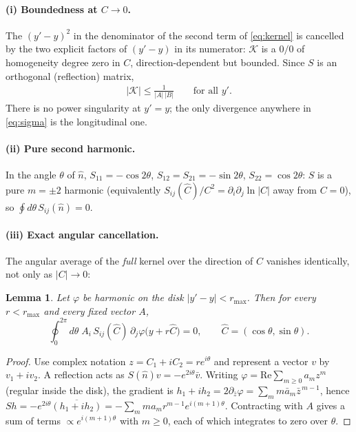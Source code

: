 \documentclass[11pt]{article}
\newtheorem{lemma}{Lemma}
\newcommand{\bA}{A}
\newcommand{\bB}{B}
\newcommand{\bC}{C}
\newcommand{\Chat}{\hat C}
\begin{document}
\paragraph{(i) Boundedness at $\bC\to0$.}  The $(y'-y)^2$ in the
denominator of the second term of \eqref{eq:kernel} is cancelled by the
two explicit factors of $(y'-y)$ in its numerator: $\mathcal K$ is a
$0/0$ of homogeneity degree zero in $\bC$, direction-dependent but
bounded.  Since $S$ is an orthogonal (reflection) matrix,
\begin{align}
|\mathcal K|\le \frac{1}{|\bA|\,|\bB|}\qquad\text{for all }y'.
\label{eq:bound}
\end{align}
There is no power singularity at $y'=y$; the only divergence anywhere
in \eqref{eq:sigma} is the longitudinal one.

\paragraph{(ii) Pure second harmonic.}  In the angle $\theta$ of
$\hat n$, $S_{11}=-\cos2\theta$, $S_{12}=S_{21}=-\sin2\theta$,
$S_{22}=\cos2\theta$: $S$ is a pure $m=\pm2$ harmonic
(equivalently $S_{ij}(\Chat)/\bC^2=\partial_i\partial_j\ln|\bC|$ away
from $\bC=0$), so $\oint d\theta\,S_{ij}(\hat n)=0$.

\paragraph{(iii) Exact angular cancellation.}  The angular average of
the \emph{full} kernel over the direction of $\bC$ vanishes identically,
not only as $|\bC|\to0$:

\begin{lemma}\label{lem:loop}
Let $\varphi$ be harmonic on the disk $|y'-y|<r_{\max}$.  Then for every
$r<r_{\max}$ and every fixed vector $\bA$,
\[
\oint_0^{2\pi} d\theta\; \bA_i\,S_{ij}(\Chat)\,
\partial_j\varphi\big(y+r\Chat\big)=0 ,
\qquad \Chat=(\cos\theta,\sin\theta).
\]
\end{lemma}

\begin{proof}
Use complex notation $z=\bC_1+i\bC_2=re^{i\theta}$ and represent a
vector $v$ by $v_1+iv_2$.  A reflection acts as
$S(\hat n)v=-e^{2i\theta}\bar v$.  Writing
$\varphi=\mathrm{Re}\sum_{m\ge0}a_m z^m$ (regular inside the disk), the
gradient is $h_1+ih_2=2\partial_{\bar z}\varphi=\sum_m m\bar a_m\bar
z^{\,m-1}$, hence
$S h=-e^{2i\theta}\overline{(h_1+ih_2)}
=-\sum_m m a_m r^{m-1}e^{i(m+1)\theta}$.
Contracting with $\bA$ gives a sum of terms $\propto e^{i(m+1)\theta}$
with $m\ge0$, each of which integrates to zero over $\theta$.
\end{proof}
\end{document}
